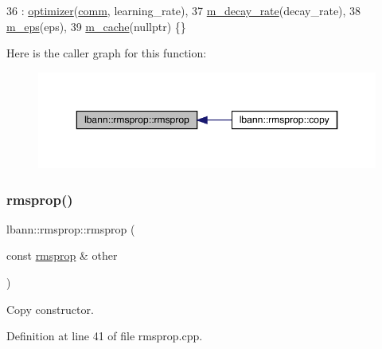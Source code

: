 \begin{DoxyCode}
36   : \hyperlink{classlbann_1_1optimizer_a136ed79c3f279ecded5be380fb67b05f}{optimizer}(\hyperlink{file__io_8cpp_ab048c6f9fcbcfaa57ce68b00263dbebe}{comm}, learning\_rate),
37     \hyperlink{classlbann_1_1rmsprop_a9cd712c44e7c4995120e2933b0387d71}{m\_decay\_rate}(decay\_rate),
38     \hyperlink{classlbann_1_1rmsprop_a6ea73caf5b2769451dfd798665877208}{m\_eps}(eps),
39     \hyperlink{classlbann_1_1rmsprop_a2bbaa35bb209e971a5ac9e1dbb6ece76}{m\_cache}(\textcolor{keyword}{nullptr}) \{\}
\end{DoxyCode}
Here is the caller graph for this function\+:\nopagebreak
\begin{figure}[H]
\begin{center}
\leavevmode
\includegraphics[width=350pt]{classlbann_1_1rmsprop_af42c8e3336e72aac926e19c57b56e59f_icgraph}
\end{center}
\end{figure}
\mbox{\label{classlbann_1_1rmsprop_af70a9a2c9ff67d0d39f14c6e283abd95}} 
\subsubsection{\texorpdfstring{rmsprop()}{rmsprop()}\hspace{0.1cm}{\footnotesize\ttfamily [2/2]}}
{\footnotesize\ttfamily lbann\+::rmsprop\+::rmsprop (\begin{DoxyParamCaption}\item[{const \hyperlink{classlbann_1_1rmsprop}{rmsprop} \&}]{other }\end{DoxyParamCaption})}

Copy constructor. 

Definition at line 41 of file rmsprop.\+cpp.



